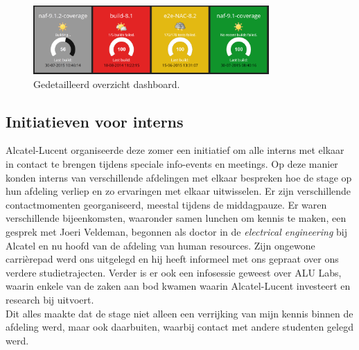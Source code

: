 \documentclass[10pt,a4paper]{article}
\begin{document}
\begin{figure}[ht!]
\centering
\includegraphics[width=90mm]{screenshot2.png}
\caption{Gedetailleerd overzicht dashboard.} 
\label{dash_2}
\end{figure}

\subsection{Initiatieven voor interns}
\label{interns}
Alcatel-Lucent organiseerde deze zomer een initiatief om alle interns met elkaar in contact te brengen tijdens speciale info-events en meetings. Op deze manier konden interns van verschillende afdelingen met elkaar bespreken hoe de stage op hun afdeling verliep en zo ervaringen met elkaar uitwisselen. Er zijn verschillende contactmomenten georganiseerd, meestal tijdens de middagpauze. Er waren verschillende bijeenkomsten, waaronder samen lunchen om kennis te maken, een gesprek met Joeri Veldeman, begonnen als doctor in de \textit{electrical engineering} bij Alcatel en nu hoofd van de afdeling van human resources. Zijn ongewone carri\`erepad werd ons uitgelegd en hij heeft informeel met ons gepraat over ons verdere studietrajecten.
Verder is er ook een infosessie geweest over ALU Labs, waarin enkele van de zaken aan bod kwamen waarin Alcatel-Lucent investeert en research bij uitvoert.\\
Dit alles maakte dat de stage niet alleen een verrijking van mijn kennis binnen de afdeling werd, maar ook daarbuiten, waarbij contact met andere studenten gelegd werd.
\end{document}

